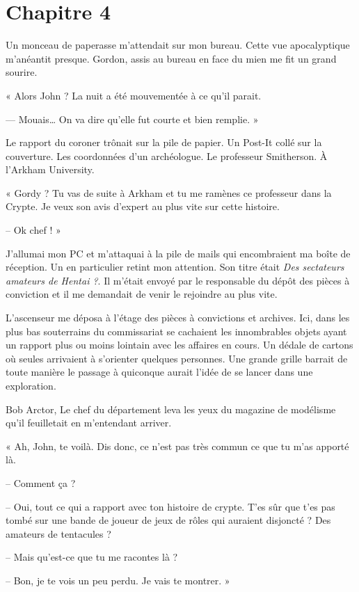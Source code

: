 \chapter[Chapitre 4]{Chapitre 4}

Un monceau de paperasse m'attendait sur mon bureau. Cette vue apocalyptique m'anéantit presque. Gordon, assis au bureau  
en face du mien me fit un grand sourire.

« Alors John ? La nuit a été mouvementée à ce qu'il parait.

— Mouais… On va dire qu'elle fut courte et bien remplie. »

Le rapport du coroner trônait sur la pile de papier. Un Post-It collé sur la couverture. Les coordonnées d'un
archéologue. Le professeur Smitherson. À l'Arkham University.

« Gordy ? Tu vas de suite à Arkham et tu me ramènes ce professeur dans la Crypte. Je veux son avis d'expert au plus
vite sur cette histoire.

-- Ok chef ! »

J'allumai mon PC et m'attaquai à la pile de mails qui encombraient ma boîte de réception. Un en particulier retint mon
attention. Son titre était \emph{Des sectateurs amateurs de Hentai ?}. Il m'était envoyé par le responsable du dépôt des 
pièces à conviction et il me demandait de venir le rejoindre au plus vite.

L'ascenseur me déposa à l'étage des pièces à convictions et archives. Ici, dans les plus bas souterrains du commissariat se
cachaient les innombrables objets ayant un rapport plus ou moins lointain avec les affaires en cours. Un dédale de
cartons où seules arrivaient à s'orienter quelques personnes. Une grande grille barrait de toute manière le passage à
quiconque aurait l'idée de se lancer dans une exploration.

Bob Arctor, Le chef du département leva les yeux du magazine de modélisme qu'il feuilletait en m'entendant arriver.

« Ah, John, te voilà. Dis donc, ce n'est pas très commun ce que tu m'as apporté là.

-- Comment ça ?

-- Oui, tout ce qui a rapport avec ton histoire de crypte. T'es sûr que t'es pas tombé sur une bande de joueur de jeux
de rôles qui auraient disjoncté ? Des amateurs de tentacules ?

-- Mais qu'est-ce que tu me racontes là ?

-- Bon, je te vois un peu perdu. Je vais te montrer. »

